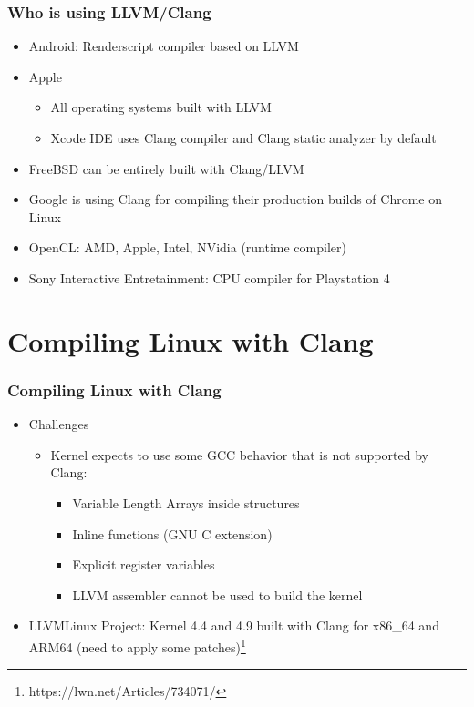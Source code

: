 \documentclass{beamer}
\begin{document}
\begin{frame}
\frametitle{Who is using LLVM/Clang}
\begin{itemize}
  \item Android: Renderscript compiler based on LLVM
  \item Apple
  \begin{itemize}
    \item All operating systems built with LLVM
    \item Xcode IDE uses Clang compiler and Clang static analyzer by default
  \end{itemize}
  \item FreeBSD can be entirely built with Clang/LLVM
  \item Google is using Clang for compiling their production builds of Chrome on Linux
  \item OpenCL: AMD, Apple, Intel, NVidia (runtime compiler)
  \item Sony Interactive Entretainment: CPU compiler for Playstation 4
\end{itemize}
\end{frame}


\section{Compiling Linux with Clang}

\begin{frame}
\frametitle{Compiling Linux with Clang}
\begin{itemize}
  \item Challenges
  \begin{itemize}
    \item Kernel expects to use some GCC behavior that is not supported by Clang:
    \begin{itemize}
      \item Variable Length Arrays inside structures
      \item Inline functions (GNU C extension)
      \item Explicit register variables
      \item LLVM assembler cannot be used to build the kernel
    \end{itemize}
  \end{itemize}
  \item LLVMLinux Project: Kernel 4.4 and 4.9 built with Clang for x86\_64 and ARM64 (need to apply some patches)\footnote{https://lwn.net/Articles/734071/}
\end{itemize}
\end{frame}
\end{document}
